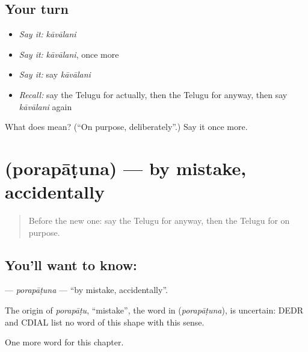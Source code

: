 \subsection*{Your turn}
\begin{itemize}
\raggedright
  \item \emph{Say it:} \emph{kāvālani}
  \item \emph{Say it:} \emph{kāvālani}, once more
  \item \emph{Say it:} say \emph{kāvālani}
  \item \emph{Recall:} say the Telugu for actually, then the Telugu for anyway, then say \emph{kāvālani} again
\end{itemize}

\begin{tcolorbox}[breakable,colback=teal!4,colframe=teal!35!black,title={Before you move on}]
What does  mean? (\textquotedblleft{}On purpose, deliberately\textquotedblright{}.) Say it once more.
\end{tcolorbox}
\section[\texorpdfstring{\te{పొరపాటున} (porapāṭuna)}{పొరపాటున (porapāṭuna)}]{ (porapāṭuna) — by mistake, accidentally}

\label{lesson:TE-C178-porapatuna}



\begin{quote}
Before the new one: say the Telugu for anyway, then the Telugu for on purpose.
\end{quote}

\subsection*{You'll want to know: }
\textbf{} — \emph{porapāṭuna} — \textquotedblleft{}by mistake, accidentally\textquotedblright{}.

\begin{cousinweb}
The origin of \emph{porapāṭu}, \textquotedblleft{}mistake\textquotedblright{}, the word in \textbf{} (\emph{porapāṭuna}), is uncertain: DEDR and CDIAL list no word of this shape with this sense.
\end{cousinweb}

\begin{grammarlens}[title={What you've built}]
One more word for this chapter.
\end{grammarlens}

